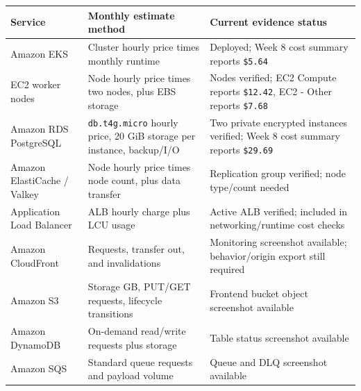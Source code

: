 {
\begingroup
\small
\setlength{\tabcolsep}{3pt}
\renewcommand{\arraystretch}{1.15}
\begin{longtable}{@{}
  >{\raggedright\arraybackslash}p{}
  >{\raggedright\arraybackslash}p{}
  >{\raggedright\arraybackslash}p{}@{}}
\toprule\noalign{}
\begin{minipage}[b]{\linewidth}\raggedright
Service
\end{minipage} & \begin{minipage}[b]{\linewidth}\raggedright
Monthly estimate method
\end{minipage} & \begin{minipage}[b]{\linewidth}\raggedright
Current evidence status
\end{minipage} \\
\midrule\noalign{}
\endhead
\bottomrule\noalign{}
\endlastfoot
Amazon EKS & Cluster hourly price times monthly runtime & Deployed; Week
8 cost summary reports \texttt{\$5.\allowbreak{}64} \\
EC2 worker nodes & Node hourly price times two nodes, plus EBS storage &
Nodes verified; EC2 Compute reports \texttt{\$12.\allowbreak{}42}, EC2 - Other
reports \texttt{\$7.\allowbreak{}68} \\
Amazon RDS PostgreSQL & \texttt{db.\allowbreak{}t4g.\allowbreak{}micro} hourly price, 20 GiB
storage per instance, backup/I/O & Two private encrypted instances
verified; Week 8 cost summary reports \texttt{\$29.\allowbreak{}69} \\
Amazon ElastiCache / Valkey & Node hourly price times node count, plus
data transfer & Replication group verified; node type/count needed \\
Application Load Balancer & ALB hourly charge plus LCU usage & Active
ALB verified; included in networking/runtime cost checks \\
Amazon CloudFront & Requests, transfer out, and invalidations &
Monitoring screenshot available; behavior/origin export still
required \\
Amazon S3 & Storage GB, PUT/GET requests, lifecycle transitions &
Frontend bucket object screenshot available \\
Amazon DynamoDB & On-demand read/write requests plus storage & Table
status screenshot available \\
Amazon SQS & Standard queue requests and payload volume & Queue and DLQ
screenshot available \\

\end{longtable}}
